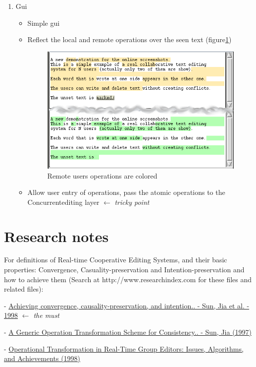 \documentclass{report}
\begin{document}
\begin{enumerate}
\item Gui

  \begin{itemize}
  \item Simple gui

  \item Reflect the local and remote operations over the seen text (figure\ref{fig:aspectcollaboratingsmallshot})
\begin{figure}[htbp]
 \begin{center}
    \includegraphics[angle=0,width=0.4\linewidth]{schemas/collaborating_small_shot.png}
 \end{center}
 \caption{Remote users operations are colored}
 \label{fig:aspectcollaboratingsmallshot}
\end{figure}
  
  \item Allow user entry of operations, pass the atomic operations to the Concurrentediting layer $\leftarrow$ \emph{tricky point}
  \end{itemize}
\end{enumerate}
\section{Research notes}

For definitions of Real-time Cooperative Editing Systems, and their basic properties: Convergence, Casuality-preservation and Intention-preservation and how to achieve them (Search at http://www.researchindex.com for these files and related files):

- \href{http://citeseer.ist.psu.edu/sun98achieving.html}{Achieving convergence, causality-preservation, and intention.. - Sun, Jia et al. - 1998} \emph{$\leftarrow$ the must}

- \href{http://citeseer.ist.psu.edu/sun97generic.html}{A Generic Operation Transformation Scheme for Consistency.. - Sun, Jia (1997)}

- \href{http://citeseer.ist.psu.edu/sun98operational.html}{Operational Transformation in Real-Time Group Editors: Issues, Algorithms, and Achievements (1998)}
\end{document}
